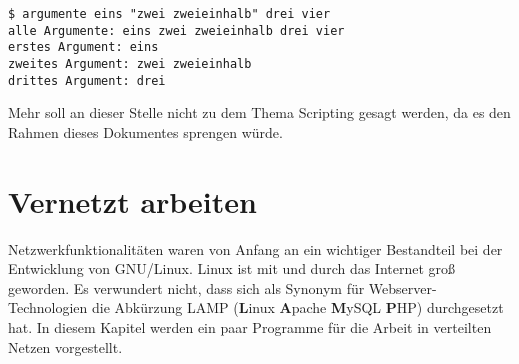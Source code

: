 \documentclass[titlepage,a4paper]{article}
\begin{document}
\begin{verbatim}
$ argumente eins "zwei zweieinhalb" drei vier
alle Argumente: eins zwei zweieinhalb drei vier
erstes Argument: eins
zweites Argument: zwei zweieinhalb
drittes Argument: drei
\end{verbatim}

Mehr soll an dieser Stelle nicht zu dem Thema Scripting gesagt werden, da es den Rahmen
dieses Dokumentes sprengen würde.









\section{Vernetzt arbeiten}
\label{sec:networking}

Netzwerkfunktionalitäten waren von Anfang an ein wichtiger Bestandteil bei der Entwicklung von GNU/Linux.
Linux ist mit und durch das Internet groß geworden.  Es verwundert nicht, dass sich als Synonym
für Webserver-Technologien die Abkürzung LAMP (\textbf{L}inux \textbf{A}pache \textbf{M}ySQL \textbf{P}HP) durchgesetzt hat.
In diesem Kapitel werden ein paar Programme für die Arbeit in verteilten Netzen vorgestellt.
\end{document}

